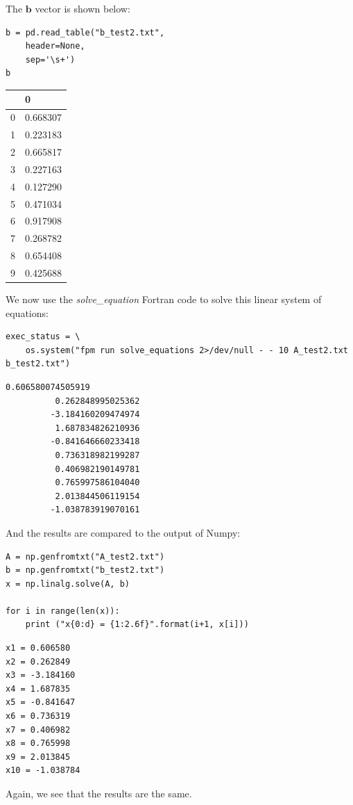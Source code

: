The $\mathbf{b}$ vector is shown below:

\begin{verbatim}
b = pd.read_table("b_test2.txt", 
    header=None, 
    sep='\s+')
b
\end{verbatim}

\bigskip\noindent
\begin{tabular}{p{}p{}}
\toprule
 & 0 \\
\hline
0 & 0.668307 \\
\hline
1 & 0.223183 \\
\hline
2 & 0.665817 \\
\hline
3 & 0.227163 \\
\hline
4 & 0.127290 \\
\hline
5 & 0.471034 \\
\hline
6 & 0.917908 \\
\hline
7 & 0.268782 \\
\hline
8 & 0.654408 \\
\hline
9 & 0.425688 \\
\hline
\bottomrule
\end{tabular}

\bigskip

We now use the \textit{solve\_equation} Fortran code to solve this linear system of equations:

\begin{verbatim}
exec_status = \
    os.system("fpm run solve_equations 2>/dev/null - - 10 A_test2.txt b_test2.txt")
\end{verbatim}

\begin{verbatim}
0.606580074505919
          0.262848995025362
         -3.184160209474974
          1.687834826210936
         -0.841646660233418
          0.736318982199287
          0.406982190149781
          0.765997586104040
          2.013844506119154
         -1.038783919070161
\end{verbatim}

And the results are compared to the output of Numpy:

\begin{verbatim}
A = np.genfromtxt("A_test2.txt")
b = np.genfromtxt("b_test2.txt")
x = np.linalg.solve(A, b)

for i in range(len(x)):
    print ("x{0:d} = {1:2.6f}".format(i+1, x[i]))
\end{verbatim}

\begin{verbatim}
x1 = 0.606580
x2 = 0.262849
x3 = -3.184160
x4 = 1.687835
x5 = -0.841647
x6 = 0.736319
x7 = 0.406982
x8 = 0.765998
x9 = 2.013845
x10 = -1.038784
\end{verbatim}

Again, we see that the results are the same.